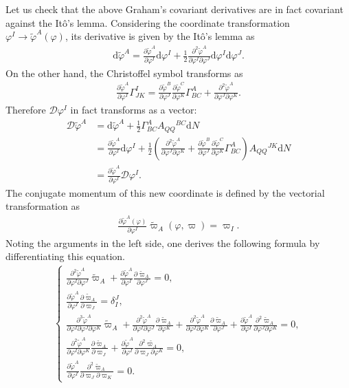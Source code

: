 \documentclass[aps, prd
, preprint
, nofootinbib 
, notitlepage
, longbibliography
]{revtex4-1}
\newcommand{\pdif}[2]{\frac{\partial #1}{\partial #2}}
\newcommand{\ppdpdpd}[3]{\frac{\partial^2 #1}{\partial #2\partial #3}}
\newcommand{\pppdpdpdpd}[4]{\frac{\partial^3 #1}{\partial #2\partial #3\partial #4}}
\newcommand{\dd}{\mathrm{d}}
\newcommand{\dps}{\displaystyle}
\newcommand{\calD}{\mathcal{D}}
\newcommand{\bae}[1]{\begin{align} #1 \end{align}}
\newcommand{\bce}[1]{\begin{cases} #1 \end{cases}}
\begin{document}
Let us check that the above Graham's covariant derivatives are in fact covariant against the It\^o's lemma.
Considering the coordinate transformation $\varphi^I\to\tilde{\varphi}^A(\varphi)$, its derivative is given by the It\^o's lemma as
\bae{
	\dd\tilde{\varphi}^A=\pdif{\tilde{\varphi}^A}{\varphi^I}\dd\varphi^I+\frac{1}{2}\frac{\partial^2\tilde{\varphi}^A}{\partial\varphi^I\partial\varphi^J}\dd\varphi^I\dd\varphi^J.
}
On the other hand, the Christoffel symbol transforms as
\bae{\label{eq: christoffel trs.}
	\pdif{\tilde{\varphi}^A}{\varphi^I}\Gamma^I_{JK}=\pdif{\tilde{\varphi}^B}{\varphi^J}\pdif{\tilde{\varphi}^C}{\varphi^K}\Gamma^A_{BC}
	+\frac{\partial^2\tilde{\varphi}^A}{\partial\varphi^J\partial\varphi^K}.
}
Therefore $\calD\varphi^I$ in fact transforms as a vector:
\bae{
	\calD\tilde{\varphi}^A&=\dd\tilde{\varphi}^A+\frac{1}{2}\Gamma^A_{BC}A_{QQ}{}^{BC}\dd N \nonumber \\
	&=\pdif{\tilde{\varphi}^A}{\varphi^I}\dd\varphi^I+\frac{1}{2}\left(\frac{\partial^2\tilde{\varphi}^A}{\partial\varphi^J\partial\varphi^K}
	+\pdif{\tilde{\varphi}^B}{\varphi^J}\pdif{\tilde{\varphi}^C}{\varphi^K}\Gamma^A_{BC}\right)A_{QQ}{}^{JK}\dd N \nonumber \\
	&=\pdif{\tilde{\varphi}^A}{\varphi^I}\calD\varphi^I.
}
The conjugate momentum of this new coordinate is defined by the vectorial transformation as
\bae{
	\pdif{\tilde{\varphi}^A(\varphi)}{\varphi^I}\tilde{\varpi}_A(\varphi,\varpi)=\varpi_I.
}
Noting the arguments in the left side, one derives the following formula by differentiating this equation.
\bae{
	\bce{
		\dps
		\ppdpdpd{\tilde{\varphi}^A}{\varphi^I}{\varphi^J}\tilde{\varpi}_A+\pdif{\tilde{\varphi}^A}{\varphi^I}\pdif{\tilde{\varpi}_A}{\varphi^J}=0, \\[10pt]
		\dps
		\pdif{\tilde{\varphi}^A}{\varphi^I}\pdif{\tilde{\varpi}_A}{\varpi_J}=\delta^J_I, \\[10pt]
		\dps
		\pppdpdpdpd{\tilde{\varphi}^A}{\varphi^I}{\varphi^J}{\varphi^K}\tilde{\varpi}_A+\ppdpdpd{\tilde{\varphi}^A}{\varphi^I}{\varphi^J}\pdif{\tilde{\varpi}_A}{\varphi^K}
		+\ppdpdpd{\tilde{\varphi}^A}{\varphi^I}{\varphi^K}\pdif{\tilde{\varpi}_A}{\varphi^J}+\pdif{\tilde{\varphi}^A}{\varphi^I}\ppdpdpd{\tilde{\varpi}_A}{\varphi^J}{\varphi^K}=0, \\[10pt]
		\dps
		\ppdpdpd{\tilde{\varphi}^A}{\varphi^I}{\varphi^K}\pdif{\tilde{\varpi}_A}{\varpi_J}+\pdif{\tilde{\varphi}^A}{\varphi^I}\ppdpdpd{\tilde{\varpi_A}}{\varpi_J}{\varphi^K}=0, \\[10pt]
		\dps
		\pdif{\tilde{\varphi}^A}{\varphi^I}\ppdpdpd{\tilde{\varpi}_A}{\varpi_J}{\varpi_K}=0.
	}
}
\end{document}

